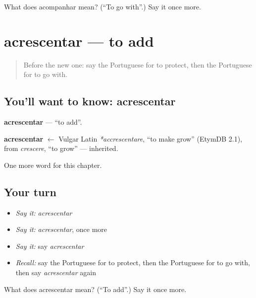 \begin{tcolorbox}[breakable,colback=teal!4,colframe=teal!35!black,title={Before you move on}]
What does acompanhar mean? (\textquotedblleft{}To go with\textquotedblright{}.) Say it once more.
\end{tcolorbox}
\section[acrescentar]{acrescentar — to add}

\label{lesson:PT-C141-acrescentar}



\begin{quote}
Before the new one: say the Portuguese for to protect, then the Portuguese for to go with.
\end{quote}

\subsection*{You'll want to know: acrescentar}
\textbf{acrescentar} — \textquotedblleft{}to add\textquotedblright{}.

\begin{cousinweb}
\textbf{acrescentar} $\leftarrow$ Vulgar Latin \emph{*accrescentare}, \textquotedblleft{}to make grow\textquotedblright{} (EtymDB 2.1), from \emph{crescere}, \textquotedblleft{}to grow\textquotedblright{} — inherited.
\end{cousinweb}

\begin{grammarlens}[title={What you've built}]
One more word for this chapter.
\end{grammarlens}

\subsection*{Your turn}
\begin{itemize}
\raggedright
  \item \emph{Say it:} \emph{acrescentar}
  \item \emph{Say it:} \emph{acrescentar}, once more
  \item \emph{Say it:} say \emph{acrescentar}
  \item \emph{Recall:} say the Portuguese for to protect, then the Portuguese for to go with, then say \emph{acrescentar} again
\end{itemize}

\begin{tcolorbox}[breakable,colback=teal!4,colframe=teal!35!black,title={Before you move on}]
What does acrescentar mean? (\textquotedblleft{}To add\textquotedblright{}.) Say it once more.
\end{tcolorbox}
